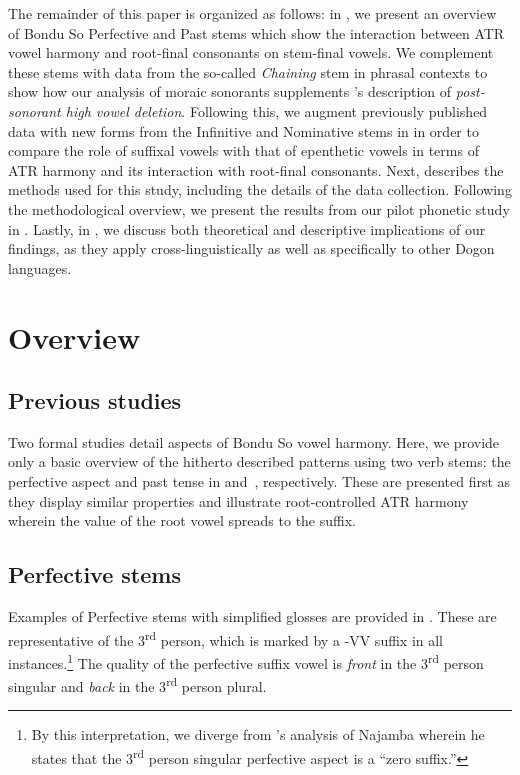 \documentclass[output=paper,colorlinks,citecolor=brown]{langscibook}
\begin{document}
The remainder of this paper is organized as follows: in , we present an overview of Bondu So Perfective and Past stems which show the interaction between ATR vowel harmony and root-final consonants on stem-final vowels. We complement these stems with data from the so-called \textit{Chaining} stem in phrasal contexts to show how our analysis of moraic sonorants supplements \citeauthor{HeathBS2017}'s \citeyearpar{HeathBS2017} description of \textit{post-sonorant high vowel deletion}. Following this, we augment previously published data with new forms from the Infinitive and Nominative stems in  in order to compare the role of suffixal vowels with that of epenthetic vowels in terms of ATR harmony and its interaction with root-final consonants. Next,  describes the methods used for this study, including the details of the data collection. Following the methodological overview, we present the results from our pilot phonetic study in . Lastly, in , we discuss both theoretical and descriptive implications of our findings, as they apply cross-linguistically as well as specifically to other Dogon languages.

\section{Overview}
\label{sec-over}

\subsection{Previous studies}
\label{subsec-prev}

Two formal studies \citep{HantganDavis, GreenHantgan} detail aspects of Bondu So vowel harmony. Here, we provide only a basic overview of the hitherto described patterns using two verb stems: the perfective aspect and past tense in  and~, respectively. These are presented first as they display similar properties and illustrate root-controlled ATR harmony wherein the value of the root vowel spreads to the suffix.

\subsection{Perfective stems}
\label{subsec-pfv}

Examples of Perfective stems with simplified glosses are provided in . These are representative of the 3\textsuperscript{rd} person, which is marked by a -VV suffix in all instances.\footnote{By this interpretation, we diverge from \citeauthor{HeathBS2017}'s \citeyearpar[10]{HeathBS2017} analysis of Najamba wherein he states that the 3\textsuperscript{rd} person singular perfective aspect is a ``zero suffix.''} The quality of the perfective suffix vowel is \textit{front} in the 3\textsuperscript{rd} person singular and \textit{back} in the 3\textsuperscript{rd} person plural.
\end{document}
